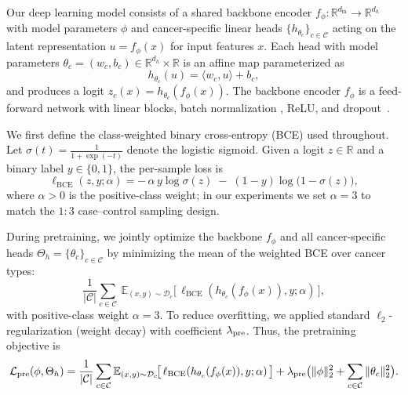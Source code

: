 \documentclass[diagnostics,article,submit,pdftex,moreauthors]{Definitions/mdpi}
\begin{document}
Our deep learning model consists of a shared backbone encoder $f_\phi:\mathbb{R}^{d_{\mathrm{in}}}\!\to\!\mathbb{R}^{d_h}$ with model parameters $\phi$ and cancer-specific linear heads $\{h_{\theta_c}\}_{c\in\mathcal{C}}$ acting on the latent representation $u=f_\phi(x)$ for input features $x$.
Each head with model parameters $\theta_c=(w_c,b_c)\in\mathbb{R}^{d_h}\times\mathbb{R}$ is an affine map parameterized as
\[
h_{\theta_c}(u)=\langle w_c,u\rangle + b_c,
\]
and produces a logit $z_c(x)=h_{\theta_c}(f_\phi(x))$.
The backbone encoder $f_\phi$ is a feed-forward network with linear blocks, batch normalization \citep{Ioffe2015_BN}, ReLU, and dropout~\citep{Srivastava2014_Dropout}.

We first define the class-weighted binary cross-entropy (BCE) used throughout.
Let $\sigma(t)=\frac{1}{1+\exp(-t)}$ denote the logistic sigmoid.
Given a logit $z\in\mathbb{R}$ and a binary label $y\in\{0,1\}$, the per-sample loss is
\begin{equation}
  \label{eq:bce}
  \ell_{\mathrm{BCE}}(z,y;\alpha)
  = -\,\alpha\,y\log \sigma(z)\;-\;(1-y)\log\!\big(1-\sigma(z)\big),
  \end{equation}
where $\alpha>0$ is the positive-class weight; in our experiments we set $\alpha=3$ to match the $1{:}3$ case--control sampling design.

During pretraining, we jointly optimize the backbone $f_\phi$ and all cancer-specific heads $\Theta_h\!=\!\{\theta_c\}_{c\in\mathcal{C}}$ by minimizing the mean of the weighted BCE over cancer types:
\begin{equation}
  \frac{1}{|\mathcal{C}|}\sum_{c\in\mathcal{C}}
  \ \mathbb{E}_{(x,y)\sim\mathcal{D}_c}\!\big[\,\ell_{\mathrm{BCE}}(h_{\theta_c}(f_\phi(x)),y;\alpha)\,\big],
\end{equation}
with positive-class weight $\alpha{=}3$. 
To reduce overfitting, we applied standard $\ell_2$-regularization
(weight decay) with coefficient $\lambda_{\mathrm{pre}}$.
Thus, the pretraining objective is
\begin{equation}
  \label{eq:pre_obj}
  \mathcal{L}_{\mathrm{pre}}(\phi,\Theta_h)
  = \frac{1}{|\mathcal{C}|}\sum_{c\in\mathcal{C}}
  \mathbb{E}_{(x,y)\sim\mathcal{D}_c}\!\big[\,\ell_{\mathrm{BCE}}(h_{\theta_c}(f_\phi(x)),y;\alpha)\,\big]
  + \lambda_{\mathrm{pre}} \big( \|\phi\|_2^2 + \sum_{c\in\mathcal{C}} \|\theta_c\|_2^2 \big).
\end{equation}
\end{document}
